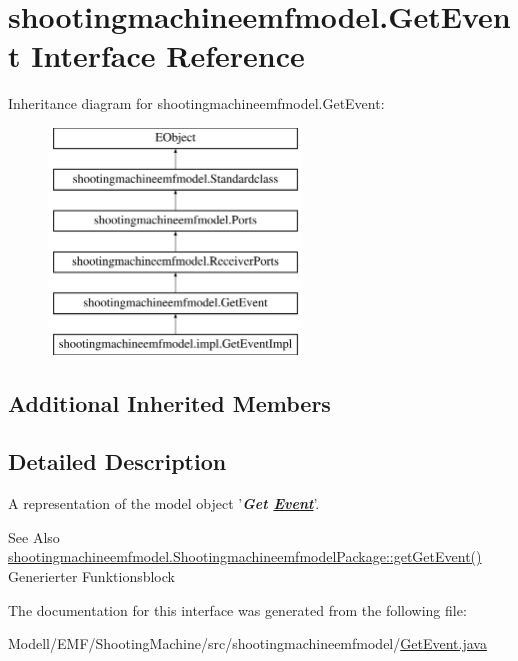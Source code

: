 \hypertarget{interfaceshootingmachineemfmodel_1_1_get_event}{\section{shootingmachineemfmodel.\-Get\-Event Interface Reference}
\label{interfaceshootingmachineemfmodel_1_1_get_event}
}
Inheritance diagram for shootingmachineemfmodel.\-Get\-Event\-:\begin{figure}[H]
\begin{center}
\leavevmode
\includegraphics[height=6.000000cm]{interfaceshootingmachineemfmodel_1_1_get_event}
\end{center}
\end{figure}
\subsection*{Additional Inherited Members}


\subsection{Detailed Description}
A representation of the model object '{\itshape {\bfseries Get \hyperlink{interfaceshootingmachineemfmodel_1_1_event}{Event}}}'.

\begin{DoxySeeAlso}{See Also}
\hyperlink{interfaceshootingmachineemfmodel_1_1_shootingmachineemfmodel_package_a18cae5052cd551770c2a4a7f729aa982}{shootingmachineemfmodel.\-Shootingmachineemfmodel\-Package\-::get\-Get\-Event()}  Generierter Funktionsblock 
\end{DoxySeeAlso}


The documentation for this interface was generated from the following file\-:\begin{DoxyCompactItemize}
\item 
Modell/\-E\-M\-F/\-Shooting\-Machine/src/shootingmachineemfmodel/\hyperlink{_get_event_8java}{Get\-Event.\-java}\end{DoxyCompactItemize}
